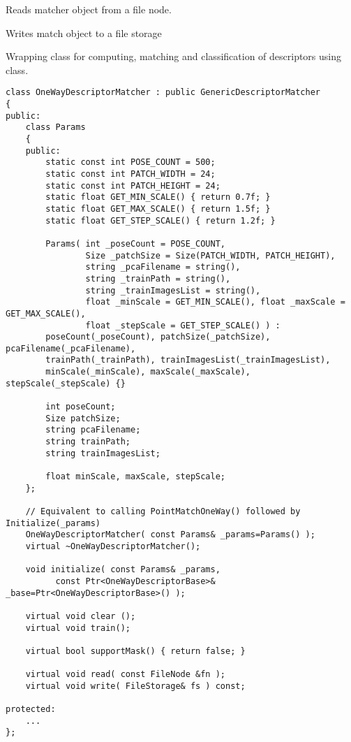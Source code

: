 Reads matcher object from a file node.


Writes match object to a file storage
    

Wrapping class for computing, matching and classification of descriptors using  class.

\begin{lstlisting}
class OneWayDescriptorMatcher : public GenericDescriptorMatcher
{
public:
    class Params
    {
    public:
        static const int POSE_COUNT = 500;
        static const int PATCH_WIDTH = 24;
        static const int PATCH_HEIGHT = 24;
        static float GET_MIN_SCALE() { return 0.7f; }
        static float GET_MAX_SCALE() { return 1.5f; }
        static float GET_STEP_SCALE() { return 1.2f; }

        Params( int _poseCount = POSE_COUNT,
                Size _patchSize = Size(PATCH_WIDTH, PATCH_HEIGHT),
                string _pcaFilename = string(),
                string _trainPath = string(),
                string _trainImagesList = string(),
                float _minScale = GET_MIN_SCALE(), float _maxScale = GET_MAX_SCALE(),
                float _stepScale = GET_STEP_SCALE() ) :
        poseCount(_poseCount), patchSize(_patchSize), pcaFilename(_pcaFilename),
        trainPath(_trainPath), trainImagesList(_trainImagesList),
        minScale(_minScale), maxScale(_maxScale), stepScale(_stepScale) {}

        int poseCount;
        Size patchSize;
        string pcaFilename;
        string trainPath;
        string trainImagesList;

        float minScale, maxScale, stepScale;
    };

    // Equivalent to calling PointMatchOneWay() followed by Initialize(_params)
    OneWayDescriptorMatcher( const Params& _params=Params() );
    virtual ~OneWayDescriptorMatcher();

    void initialize( const Params& _params, 
          const Ptr<OneWayDescriptorBase>& _base=Ptr<OneWayDescriptorBase>() );

    virtual void clear ();
	virtual void train();

    virtual bool supportMask() { return false; }

    virtual void read( const FileNode &fn );
    virtual void write( FileStorage& fs ) const;

protected:
    ...
};
\end{lstlisting}

